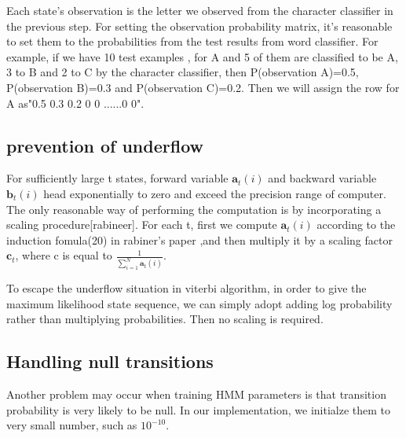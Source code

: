 \begin{enumerate}
Each state's observation is the letter we observed from the character classifier in the previous step. For setting the observation probability matrix, it's reasonable to set them to the probabilities from the test results from word classifier. For example, if we have 10 test examples , for A and 5 of them are classified to be A, 3 to B and 2 to C by the character classifier, then P(observation A)=0.5, P(observation B)=0.3 and P(observation C)=0.2. Then we will assign the row for A as"0.5 0.3 0.2 0 0 ......0 0".

\end{enumerate}

\subsection{prevention of underflow}

For sufficiently large t states, forward variable $\textbf{a}_t(i)$ and backward variable  $\textbf{b}_t(i)$ head exponentially to zero and exceed the precision range of computer. The only reasonable way of performing the computation is by incorporating a scaling procedure[rabineer].
For each t, first we compute $\textbf{a}_t(i)$ according to the induction fomula(20) in rabiner's paper \cite{Rabiner1989},and then multiply it by a scaling factor  $\textbf{c}_t$, where c is equal to $ \frac{1}{ \displaystyle\sum_{i=1}^N \textbf{a}_t(i)}$.

To escape the underflow situation in viterbi algorithm, in order to give the maximum likelihood state sequence, we can simply adopt adding log probability rather than multiplying probabilities. Then no scaling is required.

\subsection{Handling null transitions}
Another problem may occur when training HMM parameters is that transition probability is very likely to be null. In our implementation, we initialze them to very small number, such as \textbf{ $10^{-10}$}.



